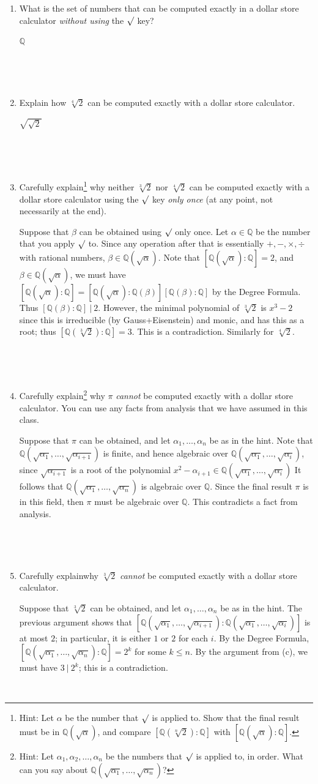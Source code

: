 \documentclass[12pt]{amsart}
\newcommand{\Bold}[1]{\contour{black}{#1}}
\newcommand{\Q}{\mathbb{Q}}
\newcommand{\solution}[1]{\ifthenelse {\equal{\displaysol}{1}} {\begin{framed}{\color{meretale}\noindent #1}\end{framed}} { \ }}
\newcommand\itema{\stepcounter{enumii}\item[{\Bold{(\theenumii)}}]}
\begin{document}
	
	\begin{enumerate}
	\itema What is the set of numbers that can be computed exactly in a dollar store calculator \emph{without using} the $\surd$ key?
	\solution{$\Q$}
	
	\
	
	\itema Explain how $\sqrt[4]{2}$ can be computed exactly with a dollar store calculator.
	\solution{$\sqrt{\sqrt{2}}$}
	
	\
	
	\itema Carefully explain\footnote{Hint: Let $\alpha$ be the number that $\surd$ is applied to. Show that the final result must be in $\Q(\sqrt{\alpha})$, and compare $[\Q(\sqrt[n]{2}):\Q]$ with $[\Q(\sqrt{\alpha}):\Q]$.} why neither $\sqrt[3]{2}$ nor $\sqrt[4]{2}$ can be computed exactly with a dollar store calculator using the $\surd$ key \emph{only once} (at any point, not necessarily at the end).
	\solution{Suppose that $\beta$ can be obtained using $\surd$ only once. Let $\alpha\in \Q$ be the number that you apply $\surd$ to. Since any operation after that is essentially $+,-,\times,\div$ with rational numbers, $\beta\in \Q(\sqrt{\alpha})$. Note that $[\Q(\sqrt{\alpha}):\Q]=2$, and $\beta\in \Q(\sqrt{\alpha})$, we must have $[\Q(\sqrt{\alpha}) : \Q] = [\Q(\sqrt{\alpha}) : \Q(\beta)] [\Q(\beta) : \Q]$ by the Degree Formula. Thus $[\Q(\beta) : \Q] \ | \ 2$. However, the minimal polynomial of $\sqrt[3]{2}$ is $x^3-2$ since this is irreducible (by Gauss+Eisenstein) and monic, and has this as a root; thus $[\Q(\sqrt[3]{2}) : \Q] = 3$. This is a contradiction. Similarly for $\sqrt[4]{2}$.}
	
	\
	
	\itema Carefully explain\footnote{Hint: Let $\alpha_1,\alpha_2,\dots,\alpha_n$ be the numbers that $\surd$ is applied to, in order. What can you say about $\Q(\sqrt{\alpha_1},\dots,\sqrt{\alpha_n})$?} why $\pi$  \emph{cannot} be computed exactly with a dollar store calculator. You can use any facts from analysis that we have assumed in this class.
	\solution{Suppose that $\pi$ can be obtained, and let $\alpha_1,\dots,\alpha_n$ be as in the hint. Note that $\Q(\sqrt{\alpha_1},\dots,\sqrt{\alpha_{i+1}})$ is finite, and hence algebraic over $\Q(\sqrt{\alpha_1},\dots,\sqrt{\alpha_{i}})$, since $\sqrt{\alpha_{i+1}}$ is a root of the polynomial $x^2-\alpha_{i+1} \in \Q(\sqrt{\alpha_1},\dots,\sqrt{\alpha_{i}})$ It follows that $\Q(\sqrt{\alpha_1},\dots,\sqrt{\alpha_n})$ is algebraic over $\Q$. Since the final result $\pi$ is in this field, then $\pi$ must be algebraic over $\Q$. This contradicts a fact from analysis.}
	
	\
		\itema Carefully explain\footnotemark[2] why $\sqrt[3]{2}$  \emph{cannot} be computed exactly with a dollar store calculator.
		\solution{Suppose that $\sqrt[3]{2}$ can be obtained, and let $\alpha_1,\dots,\alpha_n$ be as in the hint. The previous argument shows that $[\Q(\sqrt{\alpha_1},\dots,\sqrt{\alpha_{i+1}}) :\Q(\sqrt{\alpha_1},\dots,\sqrt{\alpha_{i}})]$ is at most $2$; in particular, it is either $1$ or $2$ for each $i$. By the Degree Formula, $[\Q(\sqrt{\alpha_1},\dots,\sqrt{\alpha_n}):\Q]=2^k$ for some $k\leq n$. By the argument from (c), we must have $3 \ | \ 2^k$; this is a contradiction.}
			\end{enumerate}
	
\end{document}
